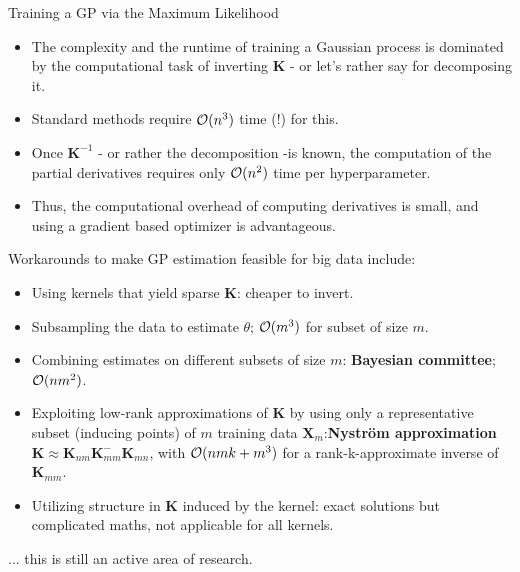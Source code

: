 \begin{frame}[c,allowframebreaks]{Training a GP via the Maximum Likelihood}
\begin{itemize}
  \item The complexity and the runtime of training a Gaussian process is dominated by the computational task of inverting $\bm{K}$ - or let's rather say for decomposing it.
  \lz
  \item Standard methods require $\mathcal{O}(n^3)$ time (!) for this.
  \lz
  \item Once $\bm{K}^{-1}$ - or rather the decomposition -is known, the computation of the partial derivatives requires only $\mathcal{O}(n^2)$ time per hyperparameter.
  \lz
  \item[\faLightbulbO] Thus, the computational overhead of computing derivatives is small, and using a gradient based optimizer is advantageous.
\end{itemize}


\framebreak
Workarounds to make GP estimation feasible for big data include:

\begin{itemize}
\item Using kernels that yield sparse $\bm K$: cheaper to invert.
\vspace{3mm}
\item Subsampling the data to estimate $\theta$; $\mathcal{O}(m^3)$ for subset of size $m$.
\vspace{3mm}
\item Combining estimates on different subsets of size $m$: \textbf{Bayesian committee}; $\mathcal{O}(n m^2)$.
\vspace{3mm}
\item Exploiting low-rank approximations of $\bm{K}$ by using only a representative subset (inducing points) of $m$ training data $\bm X_m$:\textbf{Nyström approximation} $\bm K\approx\bm K_{nm} \bm K_{mm}^{-} \bm K_{mn}$, with $\mathcal{O}(nmk + m^3)$ for a rank-k-approximate inverse of $\bm K_{mm}$.
\vspace{3mm}
\item Utilizing structure in $\bm{K}$ induced by the kernel: exact solutions but complicated maths, not applicable for all kernels.
\end{itemize}

\vspace{3mm}
... this is still an active area of research.




\end{frame}


